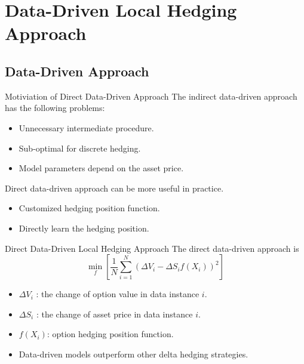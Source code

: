 \documentclass[10pt,table,mathserif]{beamer}
\begin{document}
\section{Data-Driven Local Hedging Approach}
\subsection{Data-Driven Approach}
\begin{frame}{Motiviation of Direct Data-Driven Approach}
The indirect data-driven approach has the following problems:
\begin{itemize}
  \item Unnecessary intermediate procedure.
  \item Sub-optimal for discrete hedging.
  \item Model parameters depend on the asset price.
\end{itemize}

Direct data-driven approach can be more useful in practice.
\begin{itemize}
  \item Customized hedging position function.
  \item Directly learn the hedging position.
\end{itemize}

\end{frame}

\begin{frame}{Direct Data-Driven Local Hedging Approach}
The direct data-driven approach is
\[
\min_{f}\left[\frac{1}{N} \sum_{i=1}^N (\Delta V_i-\Delta S_i f(X_i))^2 \right]
\]

\begin{itemize}
  \item $\Delta V_i$ : the change of option value in data instance $i$.
  \item $\Delta S_i$ : the change of asset price in data instance $i$.
  \item $f(X_i)$: option hedging position function.
  \item Data-driven models outperform other delta hedging strategies\footnotemark.
\end{itemize}
\end{frame}
\end{document}
